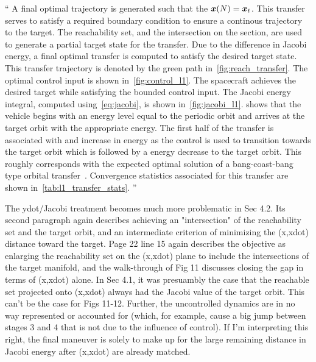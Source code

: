 \documentclass[11pt]{article}
\newenvironment{correction}{\begin{list}{}{\setlength{\leftmargin}{1cm}\setlength{\rightmargin}{1cm}}\vspace{\parsep}\item[]``}{''\end{list}}
\begin{document}
\begin{itemize}
\begin{correction}
            A final optimal trajectory is generated such that the \( \bm{x}(N) = \bm{x}_t \).
            This transfer serves to satisfy a required boundary condition to ensure a continous trajectory to the target. 
            The reachability set, and the intersection on the \Poincare section, are used to generate a partial target state for the transfer. 
            Due to the difference in Jacobi energy, a final optimal transfer is computed to satisfy the desired target state.
            This transfer trajectory is denoted by the green path in~\cref{fig:reach_transfer}.
            The optimal control input is shown in~\cref{fig:control_l1}. 
            The spacecraft achieves the desired target while satisfying the bounded control input.
            The Jacobi energy integral, computed using~\cref{eq:jacobi}, is shown in~\cref{fig:jacobi_l1}.
             shows that the vehicle begins with an energy level equal to the periodic orbit and arrives at the target orbit with the appropriate energy.
            The first half of the transfer is associated with and increase in energy as the control is used to transition towards the target orbit which is followed by a energy decrease to the target orbit.
            This roughly corresponds with the expected optimal solution of a bang-coast-bang type orbital transfer~\cite{kirk2012}.
            Convergence statistics associated for this transfer are shown in~\cref{tab:l1_transfer_stats}.
        \end{correction}

    \item
        \begin{itshape}
            The ydot/Jacobi treatment becomes much more problematic in Sec 4.2.  Its
            second paragraph again describes achieving an "intersection" of the
            reachability set and the target orbit, and an intermediate criterion of
            minimizing the (x,xdot) distance toward the target. Page 22 line 15 again
            describes the objective as enlarging the reachability set on the (x,xdot)
            plane to include the intersections of the target manifold, and the
            walk-through of Fig 11 discusses closing the gap in terms of (x,xdot)
            alone.  In Sec 4.1, it was presuambly the case that the reachable set
            projected onto (x,xdot) always had the Jacobi value of the target orbit.
            This can't be the case for Figs 11-12.  Further, the uncontrolled dynamics
            are in no way represented or accounted for (which, for example, cause a big
            jump between stages 3 and 4 that is not due to the influence of control).
            If I'm interpreting this right, the final maneuver is solely to make up for
            the large remaining distance in Jacobi energy after (x,xdot) are already
            matched.


\end{itshape}
\end{itemize}
\end{document}
